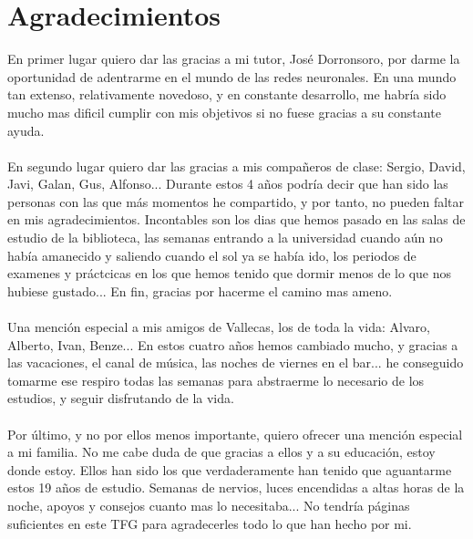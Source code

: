 \chapter*{Agradecimientos}
En primer lugar quiero dar las gracias a mi tutor, José Dorronsoro, por darme la oportunidad de adentrarme en el mundo de las redes neuronales. En una mundo tan extenso, relativamente novedoso, y en constante desarrollo, me habría sido mucho mas dificil cumplir con mis objetivos si no fuese gracias a su constante ayuda.\\\\
En segundo lugar quiero dar las gracias a mis compañeros de clase: Sergio, David, Javi, Galan, Gus, Alfonso... Durante estos 4 años podría decir que han sido las personas con las que más momentos he compartido, y por tanto, no pueden faltar en mis agradecimientos. Incontables son los dias que hemos pasado en las salas de estudio de la biblioteca, las semanas entrando a la universidad cuando aún no había amanecido y saliendo cuando el sol ya se había ido, los periodos de examenes y práctcicas en los que hemos tenido que dormir menos de lo que nos hubiese gustado... En fin, gracias por hacerme el camino mas ameno.\\\\
Una mención especial a mis amigos de Vallecas, los de toda la vida: Alvaro, Alberto, Ivan, Benze... En estos cuatro años hemos cambiado mucho, y gracias a las vacaciones, el canal de música, las noches de viernes en el bar... he conseguido tomarme ese respiro todas las semanas para abstraerme lo necesario de los estudios, y seguir disfrutando de la vida.\\\\
Por último, y no por ellos menos importante, quiero ofrecer una mención especial a mi familia. No me cabe duda de que gracias a ellos y a su educación, estoy donde estoy. Ellos han sido los que verdaderamente han tenido que aguantarme estos 19 años de estudio. Semanas de nervios, luces encendidas a altas horas de la noche, apoyos y consejos cuanto mas lo necesitaba... No tendría páginas suficientes en este TFG para agradecerles todo lo que han hecho por mi.
